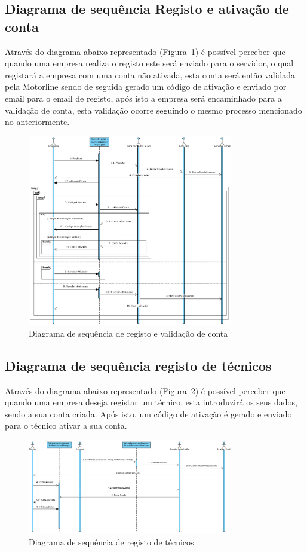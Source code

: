 \newpage

\subsection{Diagrama de sequência Registo e ativação de conta}

Através do diagrama abaixo representado (Figura~\ref{fig:31}) é possível perceber que quando uma
empresa realiza o registo este será enviado para o servidor, o qual registará a empresa com uma 
conta não ativada, esta conta será então validada pela Motorline sendo de seguida
gerado um código de ativação e enviado por email para o 
email de registo, após isto a empresa será encaminhado para a validação de conta, esta validação 
ocorre seguindo o mesmo processo mencionado no anteriormente.


\begin{figure}[htb]
    \centering
    \includegraphics[width=0.8\textwidth]{images/diagramas/sequencia/diagrama_registo.png}
    \caption{Diagrama de sequência de registo e validação de conta}
    \label{fig:31}
\end{figure}

\newpage

\subsection{Diagrama de sequência registo de técnicos}

Através do diagrama abaixo representado (Figura~\ref{fig:32}) é possível perceber que quando uma
empresa deseja registar um técnico, esta introduzirá os seus dados, sendo a sua conta criada. Após isto, 
um código de ativação é gerado e enviado para o técnico ativar a sua conta.

\begin{figure}[htb]
    \centering
    \includegraphics[width=0.8\textwidth]{images/diagramas/sequencia/registo_tecnico.png}
    \caption{Diagrama de sequência de registo de técnicos}
    \label{fig:32}
\end{figure}